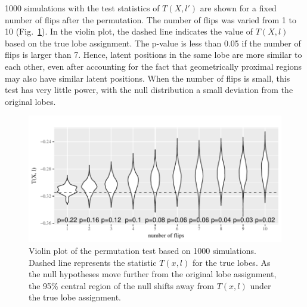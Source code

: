 \documentclass[journal,twoside,web]{ieeecolor}
\begin{document}
1000 simulations with the test statistics  of $T(X, l')$ are shown for a fixed number of flips after the permutation. 
The number of flips was varied from 1 to 10  (Fig.~\ref{fig:violin_plot}). In the violin plot, the dashed line indicates the value of $T(X, l)$ based on the true lobe assignment. 
The p-value is less than 0.05 if the number of flips is larger than 7.
Hence, latent positions in the same lobe are more similar to each other, even after accounting for the fact that geometrically proximal regions may also have similar latent positions.
When the number of flips is small, this test has very little power, with the null distribution a small deviation from the original lobes.

\begin{figure}[!htbp]
\centering
\includegraphics[width=1\linewidth]{violinplot_new_flip_2norm_1_8.pdf}
\caption{
Violin plot of the permutation test based on 1000 simulations. Dashed line represents the statistic $T(x,l)$ for the true lobes. As the null hypotheses move further from the original lobe assignment, the 95\% central region of the null shifts away from $T(x,l)$ under the true lobe assignment.}
\label{fig:violin_plot}
\end{figure}

\end{document}
